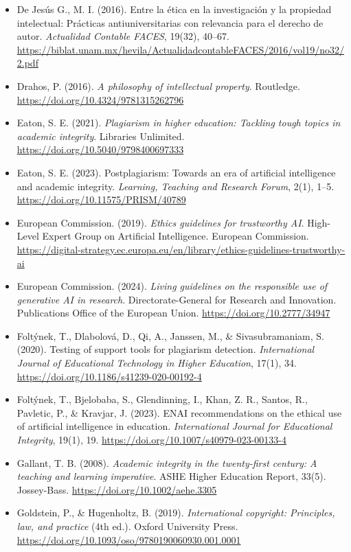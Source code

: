 \begin{itemize}[leftmargin=1.5em, label={}, itemsep=0.22ex, parsep=0pt]
\item De Jesús G., M. I. (2016). Entre la ética en la investigación y la propiedad intelectual: Prácticas antiuniversitarias con relevancia para el derecho de autor. \textit{Actualidad Contable FACES}, 19(32), 40--67. \url{https://biblat.unam.mx/hevila/ActualidadcontableFACES/2016/vol19/no32/2.pdf}
\item Drahos, P. (2016). \textit{A philosophy of intellectual property}. Routledge. \url{https://doi.org/10.4324/9781315262796}
\item Eaton, S. E. (2021). \textit{Plagiarism in higher education: Tackling tough topics in academic integrity}. Libraries Unlimited. \url{https://doi.org/10.5040/9798400697333}
\item Eaton, S. E. (2023). Postplagiarism: Towards an era of artificial intelligence and academic integrity. \textit{Learning, Teaching and Research Forum}, 2(1), 1--5. \url{https://doi.org/10.11575/PRISM/40789}
\item European Commission. (2019). \textit{Ethics guidelines for trustworthy AI}. High-Level Expert Group on Artificial Intelligence. European Commission. \url{https://digital-strategy.ec.europa.eu/en/library/ethics-guidelines-trustworthy-ai}
\item European Commission. (2024). \textit{Living guidelines on the responsible use of generative AI in research}. Directorate-General for Research and Innovation. Publications Office of the European Union. \url{https://doi.org/10.2777/34947}
\item Foltýnek, T., Dlabolová, D., Qi, A., Janssen, M., \& Sivasubramaniam, S. (2020). Testing of support tools for plagiarism detection. \textit{International Journal of Educational Technology in Higher Education}, 17(1), 34. \url{https://doi.org/10.1186/s41239-020-00192-4}
\item Foltýnek, T., Bjelobaba, S., Glendinning, I., Khan, Z. R., Santos, R., Pavletic, P., \& Kravjar, J. (2023). ENAI recommendations on the ethical use of artificial intelligence in education. \textit{International Journal for Educational Integrity}, 19(1), 19. \url{https://doi.org/10.1007/s40979-023-00133-4}
\item Gallant, T. B. (2008). \textit{Academic integrity in the twenty-first century: A teaching and learning imperative}. ASHE Higher Education Report, 33(5). Jossey-Bass. \url{https://doi.org/10.1002/aehe.3305}
\item Goldstein, P., \& Hugenholtz, B. (2019). \textit{International copyright: Principles, law, and practice} (4th ed.). Oxford University Press. \url{https://doi.org/10.1093/oso/9780190060930.001.0001}

\end{itemize}
